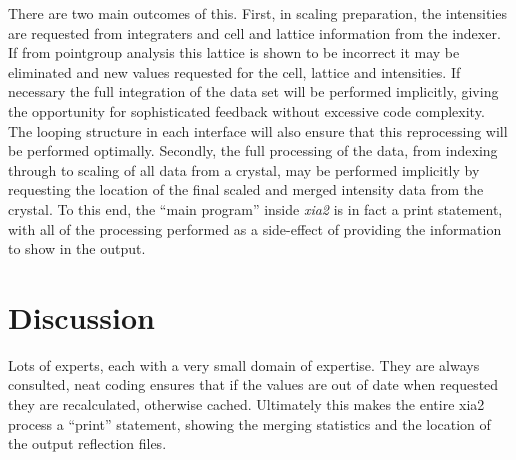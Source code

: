 \documentclass[preprint,pdf]{iucr}
\begin{document}
There are two main outcomes of this. First, in scaling preparation, 
the intensities are requested from integraters and cell and lattice
information from the indexer. If from pointgroup analysis this
lattice is shown to be incorrect it may be eliminated and new
values requested for the cell, lattice and intensities. If necessary
the full integration of the data set will be performed implicitly,
giving the opportunity for sophisticated feedback without excessive
code complexity. The looping structure in each interface will also
ensure that this reprocessing will be performed optimally.
Secondly, the full processing
of the data, from indexing through to scaling of all data from a
crystal, may be performed implicitly by requesting the location of the
final scaled and merged intensity data from the crystal. To this end,
the ``main program'' inside \emph{xia2} is in fact a print statement,
with all of the processing performed as a side-effect of providing the
information to show in the output.

\section{Discussion}

Lots of experts, each with a very small domain of expertise. They are
always consulted, neat coding ensures that if the values are out of
date when requested they are recalculated, otherwise
cached. Ultimately this makes the entire xia2 process a ``print''
statement, showing the merging statistics and the location of the
output reflection files.

{}
%

\end{document}
